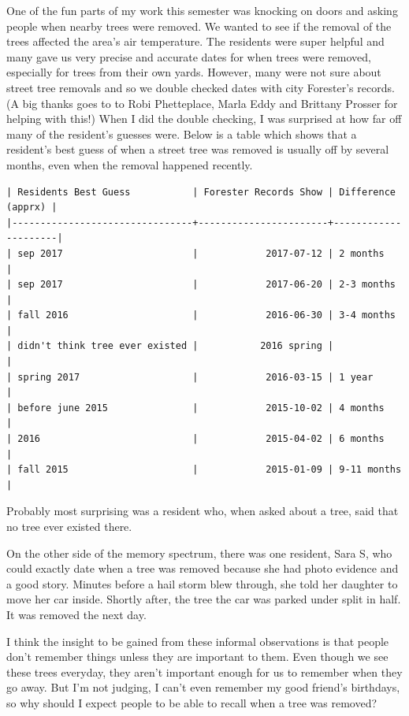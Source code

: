 \documentclass{article}
\begin{document}
One of the fun parts of my work this semester was knocking on doors
and asking people when nearby trees were removed.  We wanted to see if
the removal of the trees affected the area's air temperature.  The
residents were super helpful and many gave us very precise and
accurate dates for when trees were removed, especially for trees from
their own yards.  However, many were not sure about street tree
removals and so we double checked dates with city Forester's records.
(A big thanks goes to to Robi Phetteplace, Marla Eddy and Brittany
Prosser for helping with this!)  When I did the double checking, I was
surprised at how far off many of the resident's guesses were.  Below
is a table which shows that a resident's best guess of when a street
tree was removed is usually off by several months, even when the
removal happened recently.

\begin{verbatim}
| Residents Best Guess           | Forester Records Show | Difference  (apprx) |
|--------------------------------+-----------------------+---------------------|
| sep 2017                       |            2017-07-12 | 2 months            |
| sep 2017                       |            2017-06-20 | 2-3 months          |
| fall 2016                      |            2016-06-30 | 3-4 months          |
| didn't think tree ever existed |           2016 spring |                     |
| spring 2017                    |            2016-03-15 | 1 year              |
| before june 2015               |            2015-10-02 | 4 months            |
| 2016                           |            2015-04-02 | 6 months            |
| fall 2015                      |            2015-01-09 | 9-11 months         |
\end{verbatim}

Probably most surprising was a resident who, when asked about a
tree, said that no tree ever existed there.

On the other side of the memory spectrum, there was one resident, Sara
S, who could exactly date when a tree was removed because she had
photo evidence and a good story.  Minutes before a hail storm blew
through, she told her daughter to move her car inside.  Shortly after,
the tree the car was parked under split in half.  It was removed the
next day.

I think the insight to be gained from these informal observations is
that people don't remember things unless they are important to them.
Even though we see these trees everyday, they aren't important enough
for us to remember when they go away.  But I'm not judging, I can't
even remember my good friend's birthdays, so why should I expect people
to be able to recall when a tree was removed?
\end{document}
